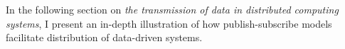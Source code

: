 \documentclass[../report.tex]{subfiles}
\begin{document}
In the following section on \textit{the transmission of data in distributed computing systems}, I present an in-depth illustration of how publish-subscribe models facilitate distribution of data-driven systems.






\end{document}
